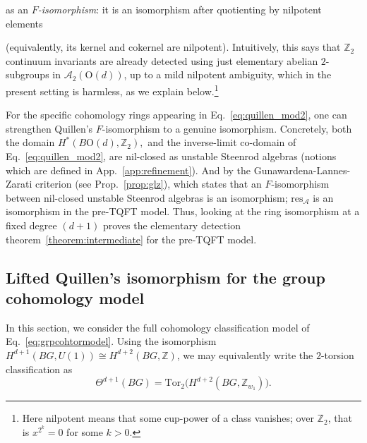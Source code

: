 \documentclass[aps,prx,reprint,superscriptaddress,twocolumn,amsmath,amssymb,amsfonts, nofootinbib]{revtex4-2}
\newcommand{\res}{\text{res}}
\newcommand{\tor}{\text{Tor}}
\newcommand{\Z}{\mathbb{Z}}
\theoremstyle{apsstyle}
\begin{document}
as an \emph{$F$-isomorphism}: it is an isomorphism after quotienting by nilpotent elements {(equivalently, its kernel and cokernel are nilpotent).
Intuitively, this says that $\mathbb{Z}_2$ continuum invariants are already detected using just elementary abelian $2$-subgroups in $\mathcal{A}_2(\mathrm{O}(d))$, up to a mild nilpotent ambiguity, which in the present setting is harmless, as we explain below.\footnote{Here nilpotent means that some cup-power of a class vanishes; over $\mathbb Z_2$, that is $x^{2^k}=0$ for some $k> 0$.}


\bigskip 

For the specific cohomology rings appearing in Eq.~\ref{eq:quillen_mod2}, one can strengthen Quillen’s $F$-isomorphism to a genuine isomorphism. Concretely, both the domain $H^{*}(B\mathrm{O}(d),\mathbb Z_{2}),$ and the inverse-limit co-domain of Eq.~\ref{eq:quillen_mod2}, are nil-closed as unstable Steenrod algebras (notions which are defined in App.~\ref{app:refinement}). And by the Gunawardena-Lannes-Zarati criterion (see Prop.~\ref{prop:glz}), which states that an $F$-isomorphism between nil-closed unstable Steenrod algebras is an isomorphism; $\res_{\mathcal A}$ is an isomorphism in the pre-TQFT model. Thus, looking at the ring isomorphism at a fixed degree $(d+1)$ proves the elementary detection theorem~\ref{theorem:intermediate} for the pre-TQFT model. 

\subsection{Lifted Quillen's isomorphism for the group cohomology model}
\label{sec:lifted_quillen}

In this section, we consider the full cohomology classification model of Eq.~\ref{eq:grpcohtormodel}. Using the isomorphism $H^{d+1}(BG,U(1))\cong H^{d+2}(BG,\Z)$, we may equivalently write the $2$-torsion classification as
\begin{equation*}
    \Theta^{d+1}(BG)= \tor_{2}\big(H^{d+2}(BG,\Z_{w_{1}})\big).
\end{equation*}

\medskip

}
\end{document}
